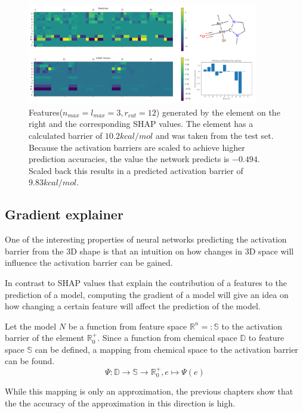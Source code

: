 \begin{figure}
    \centering
    \includegraphics[width=0.9\textwidth]{figures/evaluation/SHAP.png}
    \caption[SHAP values]{
        Features($n_{max}=l_{max}=3, r_{cut}=12$) generated by the element on the right and the corresponding SHAP values.
        The element has a calculated barrier of $10.2 kcal/mol$ and was taken from the test set.
        Because the activation barriers are scaled to achieve higher prediction accuracies,
        the value the network predicts is $-0.494$. Scaled back this results in a predicted activation 
        barrier of $9.83 kcal/mol$.
     }
    \label{fig:shap}
  \end{figure}
  



\subsection{Gradient explainer}

One of the interesting properties of neural networks predicting the activation barrier from the 3D shape is 
that an intuition on how changes in 3D space will influence the activation barrier can be gained.

In contrast to SHAP values that explain the contribution of a features to the prediction of a model, 
computing the gradient of a model will give an idea on how changing a certain feature will affect the prediction of the model.

Let the model $N$ be a function from feature space $\mathbb{R}^n =: \mathbb{S}$ to the activation barrier of the element $\mathbb{R}^+_0$.
Since a function from chemical space $\mathbb{D}$ to feature space $\mathbb{S}$ can be defined,
a mapping from chemical space to the activation barrier can be found.
$$ \Psi : \mathbb{D} \to \mathbb{S} \to \mathbb{R}^+_0, e \mapsto \Psi(e) $$

While this mapping is only an approximation, the previous chapters show that the 
the accuracy of the approximation in this direction is high.

